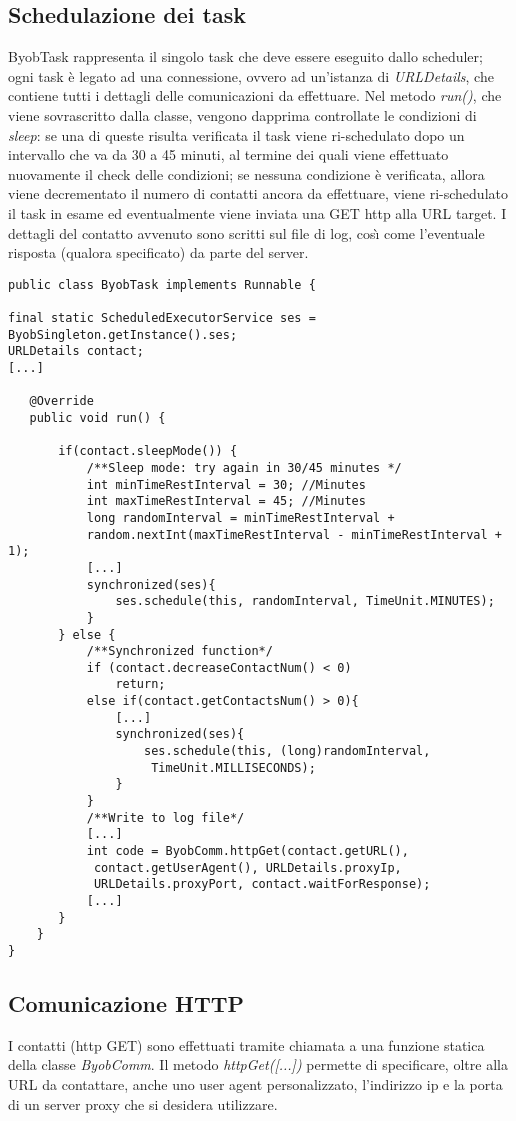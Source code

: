 \subsection{Schedulazione dei task}
ByobTask rappresenta il singolo task che deve essere eseguito dallo scheduler; ogni task \`{e} legato ad una connessione, ovvero ad un'istanza di \textit{URLDetails}, che contiene tutti i dettagli delle comunicazioni da effettuare.
Nel metodo \textit{run()}, che viene sovrascritto dalla classe, vengono dapprima controllate le condizioni di \textit{sleep}: 
se una di queste risulta verificata il task viene ri-schedulato dopo un intervallo che va da 30 a 45 minuti, al termine dei quali viene effettuato nuovamente il check delle condizioni;
se nessuna condizione \`{e} verificata, allora viene decrementato il numero di contatti ancora da effettuare, viene ri-schedulato il task in esame ed eventualmente viene inviata una GET http alla URL target.
I dettagli del contatto avvenuto sono scritti sul file di log, cos\`{\i} come l'eventuale risposta (qualora specificato) da parte del server.

\vspace{0.5cm}
\begin{lstlisting}
public class ByobTask implements Runnable {

final static ScheduledExecutorService ses = ByobSingleton.getInstance().ses;
URLDetails contact;
[...]

   @Override
   public void run() {
   
	   if(contact.sleepMode()) {
		   /**Sleep mode: try again in 30/45 minutes */
		   int minTimeRestInterval = 30; //Minutes
		   int maxTimeRestInterval = 45; //Minutes
		   long randomInterval = minTimeRestInterval + 
		   random.nextInt(maxTimeRestInterval - minTimeRestInterval + 1);
		   [...]
		   synchronized(ses){
			   ses.schedule(this, randomInterval, TimeUnit.MINUTES);
		   }
	   } else {        
		   /**Synchronized function*/
		   if (contact.decreaseContactNum() < 0) 
			   return; 
		   else if(contact.getContactsNum() > 0){
			   [...]
			   synchronized(ses){
				   ses.schedule(this, (long)randomInterval,
				    TimeUnit.MILLISECONDS);
			   }
		   }
		   /**Write to log file*/
		   [...]
		   int code = ByobComm.httpGet(contact.getURL(),
		    contact.getUserAgent(), URLDetails.proxyIp, 
		    URLDetails.proxyPort, contact.waitForResponse);
	       [...]
	   }
	}
}
\end{lstlisting}

\subsection{Comunicazione HTTP}
I contatti (http GET) sono effettuati tramite chiamata a una funzione statica della classe \textit{ByobComm}.
Il metodo \textit{httpGet([...])} permette di specificare, oltre alla URL da contattare, anche uno user agent personalizzato, l'indirizzo ip e la porta di un server proxy che si desidera utilizzare.

